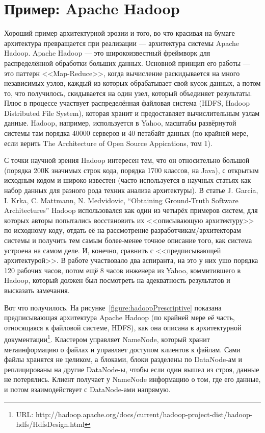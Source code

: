 \documentclass[a5paper]{article}
\begin{document}
\section{Пример: Apache Hadoop}


Хороший пример архитектурной эрозии и того, во что красивая на бумаге архитектура превращается при реализации --- архитектура системы Apache Hadoop. Apache Hadoop --- это широкоизвестный фреймворк для распределённой обработки больших данных. Основной принцип его работы --- это паттерн <<Map-Reduce>>, когда вычисление раскидывается на много независимых узлов, каждый из которых обрабатывает свой кусок данных, а потом то, что получилось, скидывается на один узел, который объединяет результаты. Плюс в процессе участвует распределённая файловая система (HDFS, Hadoop Distributed File System), которая хранит и предоставляет вычислительным узлам данные. Hadoop, например, используется в Yahoo, масштабы развёрнутой системы там порядка 40000 серверов и 40 петабайт данных (по крайней мере, если верить The Architecture of Open Source Appications, том 1).

С точки научной зрения Hadoop интересен тем, что он относительно большой (порядка 200К значимых строк кода, порядка 1700 классов, на Java), с открытым исходным кодом и широко известен (часто используется в научных статьях как набор данных для разного рода техник анализа архитектуры). В статье J. Garcia, I. Krka, C. Mattmann, N. Medvidovic, ``Obtaining Ground-Truth Software Architectures'' Hadoop использовался как один из четырёх примеров систем, для которых авторы попытались восстановить их <<описывающую архитектуру>> по исходному коду, отдать её на рассмотрение разработчикам/архитекторам системы и получить тем самым более-менее точное описание того, как система устроена на самом деле. И, конечно, сравнить с <<предписывающей архитектурой>>. В работе участвовало два аспиранта, на это у них ушо порядка 120 рабочих часов, потом ещё 8 часов инженера из Yahoo, коммитившего в Hadoop, который должен был посмотреть на адекватность результатов и высказать замечания.

Вот что получилось. На рисунке~\ref{figure:hadoopPrescriptive} показана предписывающая архитектура Apache Hadoop (по крайней мере её часть, относящаяся к файловой системе, HDFS), как она описана в архитектурной документации\footnote{URL: http://hadoop.apache.org/docs/current/hadoop-project-dist/hadoop-hdfs/HdfsDesign.html}. Кластером управляет NameNode, который хранит метаинформацию о файлах и управляет доступом клиентов к файлам. Сами файлы хранятся не целиком, а блоками, блоки разделены по DataNode-ам и реплицированы на другие DataNode-ы, чтобы если один вышел из строя, данные не потерялись. Клиент получает у NameNode информацию о том, где его данные, и потом взаимодействует с DataNode-ами напрямую.
\end{document}
